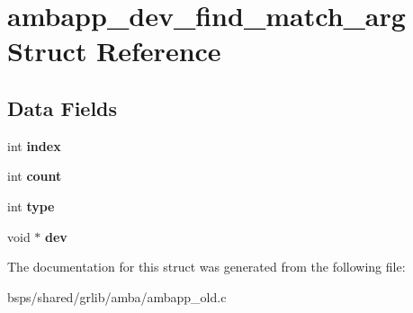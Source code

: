 \hypertarget{structambapp__dev__find__match__arg}{}\section{ambapp\+\_\+dev\+\_\+find\+\_\+match\+\_\+arg Struct Reference}
\label{structambapp__dev__find__match__arg}
\subsection*{Data Fields}
\begin{DoxyCompactItemize}
\item 
\mbox{\label{structambapp__dev__find__match__arg_a45ae145c3d254824f0246cdd9ae48d2a}} 
int {\bfseries index}
\item 
\mbox{\label{structambapp__dev__find__match__arg_aaccda679c0afe84ed7c1b95d91824dd5}} 
int {\bfseries count}
\item 
\mbox{\label{structambapp__dev__find__match__arg_a067d2cc21deffa578c6dd47216742697}} 
int {\bfseries type}
\item 
\mbox{\label{structambapp__dev__find__match__arg_a9ddf96b37151855929c28342cf68b073}} 
void $\ast$ {\bfseries dev}
\end{DoxyCompactItemize}


The documentation for this struct was generated from the following file\+:\begin{DoxyCompactItemize}
\item 
bsps/shared/grlib/amba/ambapp\+\_\+old.\+c\end{DoxyCompactItemize}
